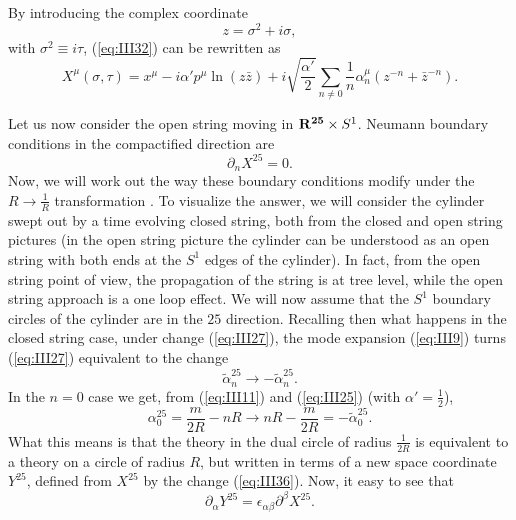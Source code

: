 By introducing the complex coordinate 
\begin{equation}
z= \sigma^2 + i\sigma,
\label{eq:III34}
\end{equation}
with $\sigma^2 \equiv i \tau$, (\ref{eq:III32}) can be rewritten as
\begin{equation}
X^{\mu} (\sigma,\tau)=x^{\mu} -i \alpha' p^{\mu} \ln(z \bar{z}) + i 
\sqrt{\frac {\alpha'}{2}} \sum_{n \neq 0} \frac {1}{n} \alpha_n^{\mu} 
(z^{-n}+\bar{z}^{-n}). 
\label{eq:III35}
\end{equation}
  
Let us now consider the open string moving in ${\bf R^{25}} \times S^1$. 
Neumann boundary conditions in the compactified direction are
\begin{equation}
\partial_n X^{25} = 0.
\label{eq:III35b}
\end{equation}
Now, we will work out the way these boundary conditions modify under the 
$R \rightarrow \frac {1}{R}$ transformation \cite{GP}. To visualize the answer, 
we will consider the cylinder swept out by a time evolving closed 
string, both from the closed and open string pictures (in the open 
string picture the cylinder can be understood as an open string with both 
ends at the $S^1$ edges of the cylinder). In fact, from the 
open string point of view, the propagation of the string is at tree 
level, while the open string approach is a one loop effect. We will now 
assume that the $S^1$ boundary circles of the cylinder are in the $25$ 
direction. Recalling then what happens in the closed string case, under 
change (\ref{eq:III27}), the mode expansion (\ref{eq:III9}) turns 
(\ref{eq:III27}) equivalent to the change
\begin{equation}
\tilde{\alpha}^{25}_n \rightarrow - \tilde{\alpha}_n^{25}.
\label{eq:III36}
\end{equation}
In the $n=0$ case we get, from (\ref{eq:III11}) and (\ref{eq:III25}) 
(with $\alpha'=\frac {1}{2}$),
\begin{equation}
\alpha_0^{25} = \frac {m}{2R} -nR \rightarrow nR - \frac {m}{2R} = 
- \tilde{\alpha}_0^{25}.
\label{eq:III37}
\end{equation}
What this means is that the theory in the dual circle of radius $\frac {1}{2R}$ is 
equivalent to a theory on a circle of radius $R$, but written in terms  
of a new space coordinate $Y^{25}$, defined from $X^{25}$ by the change (\ref{eq:III36}). 
Now, it easy to see that 
\begin{equation}
\partial_{\alpha} Y^{25} = \epsilon_{\alpha \beta} \partial^{\beta} X^{25}.
\label{eq:III38}
\end{equation}
  
